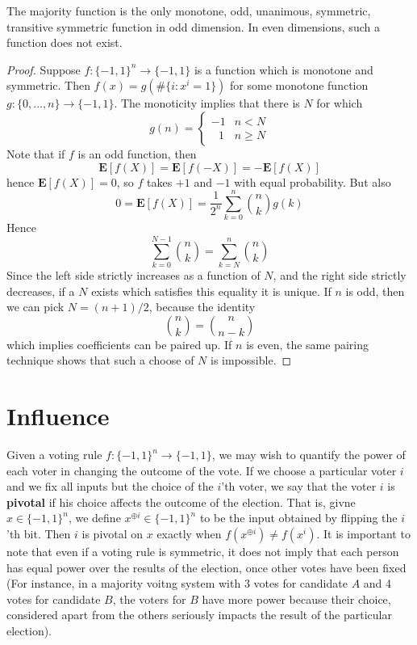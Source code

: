\begin{theorem}
    The majority function is the only monotone, odd, unanimous, symmetric, transitive symmetric function in odd dimension. In even dimensions, such a function does not exist.
\end{theorem}
\begin{proof}
    Suppose $f: \{ -1, 1 \}^n \to \{ -1, 1 \}$ is a function which is monotone and symmetric. Then $f(x) = g(\# \{ i : x^i = 1 \})$ for some monotone function $g: \{ 0, \dots, n \} \to \{ -1, 1 \}$. The monoticity implies that there is $N$ for which
    \[ g(n) = \begin{cases} -1 & n < N \\ \ \ \ 1 & n \geq N \end{cases} \]
    Note that if $f$ is an odd function, then
    \[ \mathbf{E}[f(X)] = \mathbf{E}[f(-X)] = - \mathbf{E}[f(X)] \]
    hence $\mathbf{E}[f(X)] = 0$, so $f$ takes $+1$ and $-1$ with equal probability. But also
    \[ 0 = \mathbf{E}[f(X)] = \frac{1}{2^n} \sum_{k = 0}^n {n \choose k} g(k) \]
    Hence
    \[ \sum_{k = 0}^{N-1} {n \choose k} = \sum_{k = N}^n {n \choose k} \]
    Since the left side strictly increases as a function of $N$, and the right side strictly decreases, if a $N$ exists which satisfies this equality it is unique. If $n$ is odd, then we can pick $N = (n+1)/2$, because the identity
    \[ {n \choose k} = {n \choose n-k} \]
    which implies coefficients can be paired up. If $n$ is even, the same pairing technique shows that such a choose of $N$ is impossible.
\end{proof}

\section{Influence}

Given a voting rule $f: \{ -1, 1 \}^n \to \{ -1, 1 \}$, we may wish to quantify the power of each voter in changing the outcome of the vote. If we choose a particular voter $i$ and we fix all inputs but the choice of the $i$'th voter, we say that the voter $i$ is {\bf pivotal} if his choice affects the outcome of the election. That is, givne $x \in \{ -1, 1 \}^n$, we define $x^{\oplus i} \in \{ -1, 1 \}^n$ to be the input obtained by flipping the $i$'th bit. Then $i$ is pivotal on $x$ exactly when $f(x^{\oplus i}) \neq f(x^i)$. It is important to note that even if a voting rule is symmetric, it does not imply that each person has equal power over the results of the election, once other votes have been fixed (For instance, in a majority voitng system with 3 votes for candidate $A$ and 4 votes for candidate $B$, the voters for $B$ have more power because their choice, considered apart from the others seriously impacts the result of the particular election).


